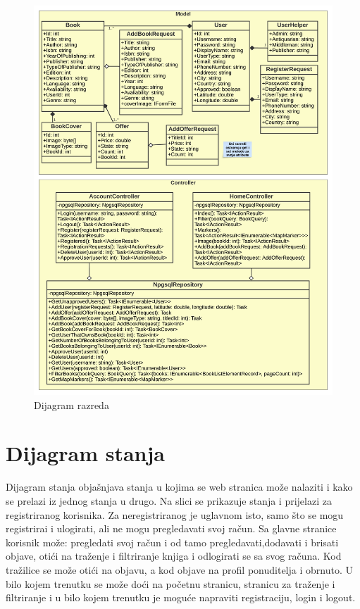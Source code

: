 			\begin{figure}[h]
				\centering
				\includegraphics[width = \textwidth]{slike/dijagramKlasa.PNG}
				\caption{Dijagram razreda}
				\label{fig:enter-label}
			\end{figure}
			
			\clearpage
		
		\section{Dijagram stanja}
			
			
			\raggedright{Dijagram stanja objašnjava stanja u kojima se web stranica može nalaziti i kako se prelazi iz jednog stanja u drugo. Na slici se 							prikazuje stanja i prijelazi za registriranog korisnika. Za neregistriranog je uglavnom isto, samo što se mogu registrirai i ulogirati, ali  ne mogu pregledavati svoj račun. Sa glavne stranice korisnik može: pregledati svoj račun i od tamo pregledavati,dodavati i brisati objave, otići na traženje i filtriranje knjiga i odlogirati se sa svog računa. Kod tražilice se može otići na objavu, a kod objave na profil ponuditelja i obrnuto. U bilo kojem trenutku se može doći na početnu stranicu, stranicu za traženje i filtriranje i u bilo kojem trenutku je moguće napraviti registraciju, login i logout.} 

